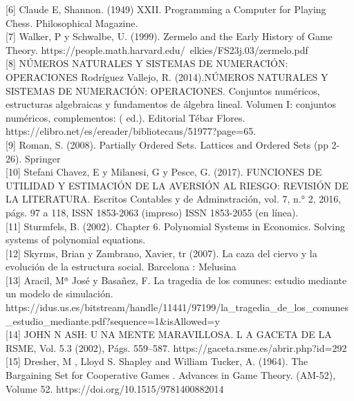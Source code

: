 \documentclass[10pt,a4paper]{book}
\begin{document}
[6] Claude E, Shannon. (1949) XXII. Programming a Computer for Playing Chess.  Philosophical Magazine. 
\\

[7] Walker, P y Schwalbe, U. (1999). Zermelo and the Early History of Game Theory. https://people.math.harvard.edu/~elkies/FS23j.03/zermelo.pdf \\

[8] NÚMEROS NATURALES Y SISTEMAS DE NUMERACIÓN: OPERACIONES Rodríguez Vallejo, R. (2014).NÚMEROS NATURALES Y SISTEMAS DE NUMERACIÓN: OPERACIONES. Conjuntos numéricos, estructuras algebraicas y fundamentos de álgebra lineal. Volumen I: conjuntos numéricos, complementos: ( ed.). Editorial Tébar Flores. https://elibro.net/es/ereader/bibliotecaus/51977?page=65. \\

[9] Roman, S. (2008). Partially Ordered Sets. Lattices and Ordered Sets (pp 2-26). Springer\\

[10] Stefani Chavez, E y Milanesi, G y Pesce, G. (2017). FUNCIONES DE UTILIDAD Y ESTIMACIÓN DE LA AVERSIÓN AL RIESGO: REVISIÓN DE LA LITERATURA. Escritos Contables y de Adminstración, vol. 7, n.° 2, 2016, págs. 97 a 118,
ISSN 1853-2063 (impreso) ISSN 1853-2055 (en línea). \\

[11] Sturmfels, B. (2002). Chapter 6. Polynomial Systems in Economics. Solving systems of polynomial equations. \\

[12] Skyrms, Brian y Zambrano, Xavier, tr (2007). La caza del ciervo y la evolución de la estructura social. Barcelona : Melusina \\

[13] Aracil, Mª José y Basañez, F. La tragedia de los comunes: estudio mediante un modelo de simulación. \\
https://idus.us.es/bitstream/handle/11441/97199/la_tragedia_de_los_comunes_estudio_mediante.pdf?sequence=1&isAllowed=y \\

[14] JOHN N ASH: U NA MENTE MARAVILLOSA. L A GACETA DE LA RSME, Vol. 5.3 (2002), Págs. 559–587. https://gaceta.rsme.es/abrir.php?id=292 \\

[15] Dresher, M , Lloyd S. Shapley and William Tucker, A. (1964). The Bargaining Set for Cooperative Games . Advances in Game Theory. (AM-52), Volume 52. https://doi.org/10.1515/9781400882014 \\
\end{document}
